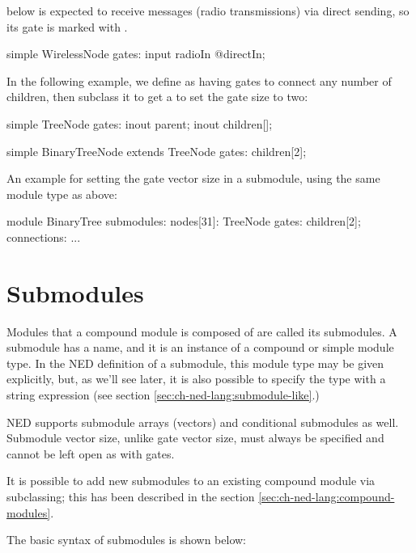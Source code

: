  below is expected to receive messages (radio transmissions)
via direct sending, so its  gate is marked with .

\begin{ned}
simple WirelessNode {
    gates:
        input radioIn @directIn;
}
\end{ned}

In the following example, we define  as having gates to connect
any number of children, then subclass it to get a  to
set the gate size to two:

\begin{ned}
simple TreeNode {
    gates:
        inout parent;
        inout children[];
}

simple BinaryTreeNode extends TreeNode {
    gates:
        children[2];
}
\end{ned}

An example for setting the gate vector size in a submodule, using the same
 module type as above:

\begin{ned}
module BinaryTree {
    submodules:
        nodes[31]: TreeNode {
            gates:
                children[2];
        }
    connections:
        ...
}
\end{ned}



\section{Submodules}
\label{sec:ch-ned-lang:submodules}

Modules that a compound module is composed of are called its submodules.
A submodule has a name, and it is an instance of a compound or simple
module type. In the NED definition of a submodule, this module type
may be given explicitly, but, as we'll see later, it is also possible
to specify the type with a string expression (see section
\ref{sec:ch-ned-lang:submodule-like}.)

NED supports submodule arrays (vectors) and conditional submodules as well.
Submodule vector size, unlike gate vector size, must always be specified
and cannot be left open as with gates.

It is possible to add new submodules to an existing compound module via
subclassing; this has been described in the section
\ref{sec:ch-ned-lang:compound-modules}.

The basic syntax of submodules is shown below:

